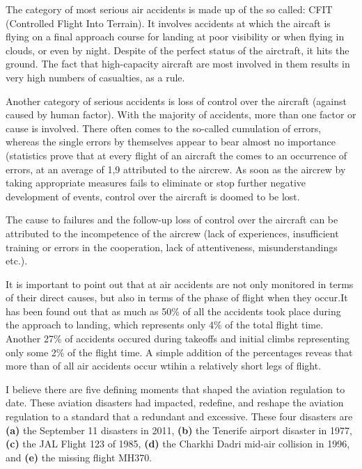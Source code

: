 \documentclass[a4paper,10pt]{article}
\begin{document}
The category of most serious air accidents is made up of the so called: CFIT (Controlled Flight
Into Terrain). It involves accidents at which the aircaft is flying on a final approach course for landing
at poor visibility or when flying in clouds, or even by night. Despite of the perfect status of the
airctraft, it hits the ground. The fact that high-capacity aircraft are most involved in them results in
very high numbers of casualties, as a rule.\par

Another category of serious accidents is loss of control over the aircraft (against caused by human
factor). With the majority of accidents, more than one factor or cause is involved. There often comes
to the so-called cumulation of errors, whereas the single errors by themselves appear to bear almost
no importance (statistics prove that at every flight of an aircraft the comes to an occurrence of
errors, at an average of 1,9 attributed to the aircrew. As soon as the aircrew by taking appropriate
measures fails to eliminate or stop further negative development of events, control over the aircraft
is doomed to be lost.\par

The cause to failures and the follow-up loss of control over the aircraft can be attributed to the
incompetence of the aircrew (lack of experiences, insufficient training or errors in the cooperation,
lack of attentiveness, misunderstandings etc.).\par

It is important to point out that at air accidents are not only monitored in terms of their direct
causes, but also in terms of the phase of flight when they occur.It has been found out that as much as
50\% of all the accidents took place during the approach to landing, which represents only 4\% of the
total flight time. Another 27\% of accidents occured during takeoffs and initial climbs representing
only some 2\% of the flight time. A simple addition of the percentages reveas that more than
of all air accidents occur wtihin a relatively short legs of flight.\par

I believe there are five defining moments that shaped the aviation regulation to date. These aviation disasters had impacted, redefine, and reshape the aviation regulation to a standard that a redundant and excessive. These four disasters are 
\textbf{(a)} the September 11 disasters in 2011, 
\textbf{(b)} the Tenerife airport disaster in 1977, 
\textbf{(c)} the JAL Flight 123 of 1985,
\textbf{(d)} the Charkhi Dadri mid-air collision in 1996, and
\textbf{(e)} the missing flight MH370.
\end{document}
